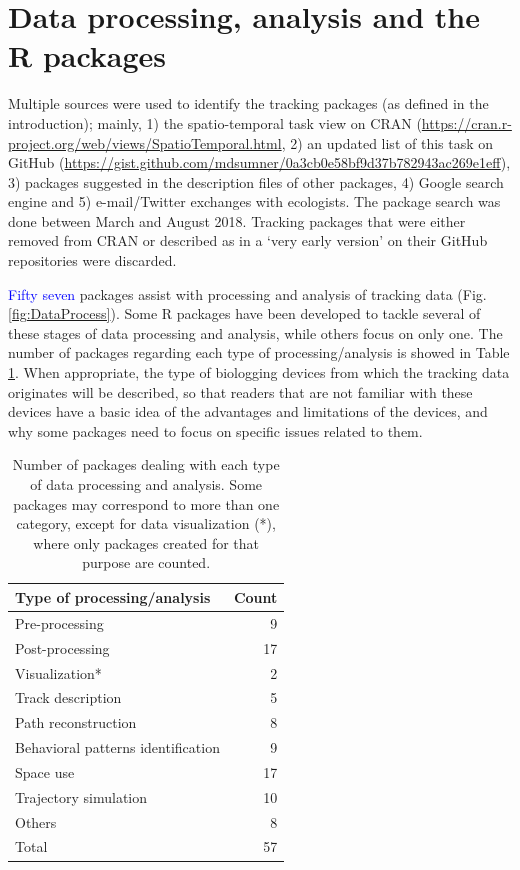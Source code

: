 \documentclass[a4paper,12pt]{article}
\begin{document}
\section*{Data processing, analysis and the R packages}

Multiple sources were used to identify the tracking packages (as defined in the introduction); mainly, 1) the spatio-temporal task view on CRAN (\url{https://cran.r-project.org/web/views/SpatioTemporal.html}, 2) an updated list of this task on GitHub (\url{https://gist.github.com/mdsumner/0a3cb0e58bf9d37b782943ac269e1eff}), 3) packages suggested in the description files of other packages, 4) Google search engine and 5) e-mail/Twitter exchanges with ecologists. The package search was done between March and August 2018. Tracking packages that were either removed from CRAN or described as in a `very early version' on their GitHub repositories were discarded. 

\textcolor{blue}{Fifty seven} packages assist with processing and analysis of tracking data (Fig. \ref{fig:DataProcess}). Some R packages have been developed to tackle several of these stages of data processing and analysis, while others focus on only one. The number of packages regarding each type of processing/analysis is showed in Table \ref{table:PurposeTable}. When appropriate, the type of biologging devices from which the tracking data originates will be described, so that readers that are not familiar with these devices have a basic idea of the advantages and limitations of the devices, and why some packages need to focus on specific issues related to them. 
%
\begin{table}[ht]
	\centering
	\begin{tabular}{lr}
		\hline
		Type of processing/analysis & Count \\ 
		\hline
		Pre-processing & 9 \\
		Post-processing & 17 \\
		Visualization* & 2 \\ 
		Track description & 5 \\ 
		Path reconstruction  & 8 \\ 
		Behavioral patterns identification & 9 \\ 
		Space use & 17 \\ 
		Trajectory simulation & 10 \\ 
		Others & 8 \\ 
		\hline
		Total & 57 \\
		\hline
	\end{tabular}
	\caption{\label{table:PurposeTable} Number of packages dealing with each type of data processing and analysis. Some packages may correspond to more than one category, except for data visualization (*), where only packages created for that purpose are counted.}
\end{table}
\end{document}
